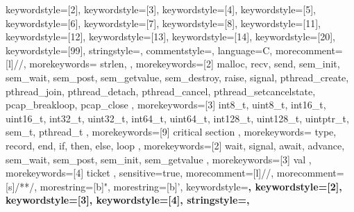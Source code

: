 {	keywordstyle=[2]\lstCFontPredefLib,%
	keywordstyle=[3]\lstCFontFuncCall,%
	keywordstyle=[4]\lstCFontType,%
	keywordstyle=[5]\lstCFontCollection,%
	keywordstyle=[6]\lstCFontVar,%
	keywordstyle=[7]\lstCFontSpecialBasic,%
	keywordstyle=[8]\lstCFontSpecialLib,%
	keywordstyle=[11]\lstCFontForeignA,%
	keywordstyle=[12]\lstCFontForeignB,%
	keywordstyle=[13]\lstCFontObject,%
	keywordstyle=[14]\lstCFontMoreKey,%
	keywordstyle=[20]\lstCFontString,%
	keywordstyle=[99]\lstCFontHighRed,%
	stringstyle=\lstCFontString,%
	commentstyle=\lstCFontComment,%
}%
%
{%
	language=C,%
	morecomment=[l]{//},%
	morekeywords={%
		strlen,
	},%
	morekeywords=[2]{%
		malloc,
		recv,
		send,
		sem_init,
		sem_wait,
		sem_post,
		sem_getvalue,
		sem_destroy,
		raise,
		signal,
		pthread_create,
		pthread_join,
		pthread_detach,
		pthread_cancel,
		pthread_setcancelstate,
		pcap_breakloop,
		pcap_close
	},%
	morekeywords=[3]{%
		int8_t,
		uint8_t,
		int16_t,
		uint16_t,
		int32_t,
		uint32_t,
		int64_t,
		uint64_t,
		int128_t,
		uint128_t,
		uintptr_t,
		sem_t,
		pthread_t
	},%
	morekeywords=[9]{%
		critical section
	},%
}%
%
{%
	morekeywords={%
		type,
		record,
		end,
		if,
		then,
		else,
		loop
	},%
	morekeywords=[2]{%
		wait,
		signal,
		await,
		advance,
		sem_wait,
		sem_post,
		sem_init,
		sem_getvalue
	},%
	morekeywords=[3]{%
		val
	},%
	morekeywords=[4]{%
		ticket
	},%
	sensitive=true,%
	morecomment=[l]{//},%
	morecomment=[s]{/*}{*/},%
	morestring=[b]",%
	morestring=[b]',%
	keywordstyle=\bfseries\ttfamily\color{blue},%
	keywordstyle=[2]\bfseries\ttfamily\color{teal},%
	keywordstyle=[3]\bfseries\ttfamily\color{olive},%
	keywordstyle=[4]\bfseries\ttfamily\color{olive},%
	stringstyle=\color{green}\ttfamily,%
}%
